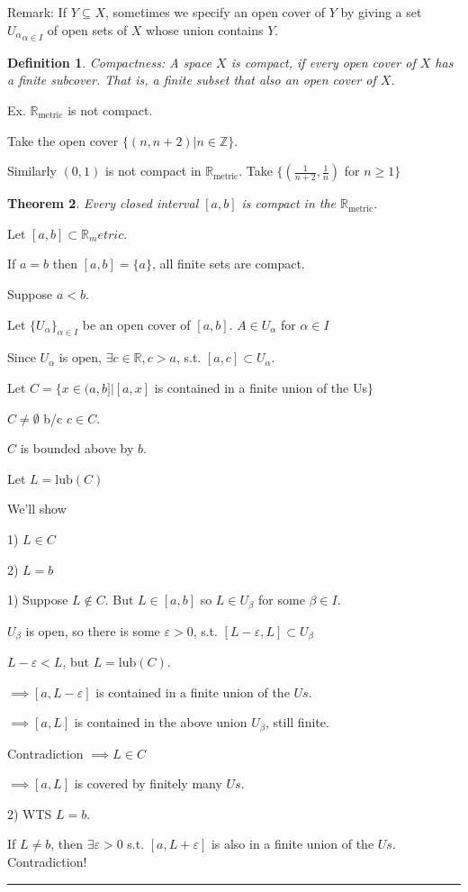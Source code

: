 \documentclass[twoside]{article}
\newcounter{lecnum}
\newcommand{\Z}{\mathbb{Z}}
\newcommand{\lub}{\text{lub}}
\newcommand{\ep}{\varepsilon}
\renewcommand{\b}{\beta}
\newcommand{\metric}{\text{metric}}
\renewcommand{\a}{\alpha}
\newtheorem{theorem}{Theorem}[lecnum]
\newtheorem{definition}[theorem]{Definition}
\newenvironment{proof}{{\bf Proof:}}{\hfill\rule{2mm}{2mm}}
\newcommand\R{\mathbb{R}}
\begin{document}
Remark: If $Y \subseteq X$, sometimes we specify an open cover of $Y$ by giving a set ${U_\alpha}_{\alpha \in I}$ of open sets of $X$ whose union contains $Y$. 

\begin{definition}
    Compactness: A space $X$ is compact, if every open cover of $X$ has a finite subcover. That is, a finite subset that also an open cover of $X$. 
\end{definition}


Ex. $\R_\metric$ is not compact.

Take the open cover $\{(n, n+2) \vert n \in \Z\}$. 

Similarly $(0,1)$ is not compact in $\R_\metric$. Take $\{(\frac1{n+2}, \frac1{n})$ for $n \geq 1 \}$

\begin{theorem}
    Every closed interval $[a,b]$ is compact in the $\R_\metric$.     
\end{theorem}

\begin{proof}
    Let $[a,b] \subset \R_metric$. 

    If $a = b$ then $[a,b] = \{a\}$, all finite sets are compact. 

    Suppose $a < b$. 

    Let $\{U_\alpha\}_{\alpha \in I}$ be an open cover of $[a,b]$. $A \in U_{\alpha}$ for $\alpha \in I$

    Since $U_\a$ is open, $\exists c \in \R, c > a$, s.t. $[a,c] \subset U_\alpha$. 

    Let $C = \{x \in (a,b] \vert [a,x]$ is contained in a finite union of the Us$\}$

    $C \neq \emptyset$ b/c $c \in C$. 

    $C$ is bounded above by $b$. 

    Let $L = \lub(C)$

    We'll show 
    
    1) $L \in C$

    2) $L = b$

    1) Suppose $L \not\in C$. But $L \in [a,b]$ so $L \in U_\beta$ for some $\beta \in I$. 

    $U_\beta$ is open, so there is some $\ep>0$, s.t. $[L-\ep,L] \subset U_\beta$
    
    $L - \ep < L$, but $L = \lub(C)$. 
    
    $\implies [a, L-\ep]$ is contained in a finite union of the $Us$. 

    $\implies [a,L]$ is contained in the above union $U_\b$, still finite. 
    
    Contradiction  $\implies L \in C$

    $\implies [a,L]$ is covered by finitely many $Us$.
    
    2) WTS $L = b$.

    If $L \neq b$, then $\exists \ep > 0$ s.t. $[a, L+\ep]$ is also in a finite union of the $Us$. Contradiction!  

\end{proof}
\end{document}
